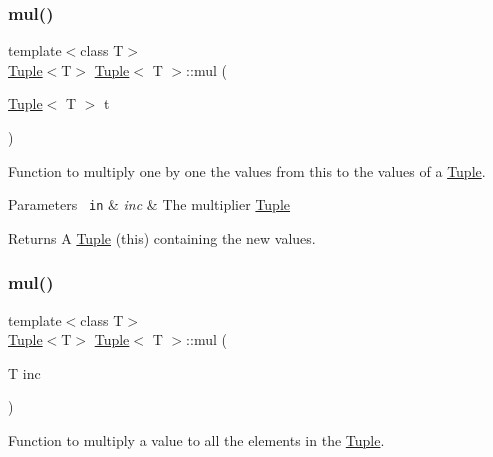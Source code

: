 \subsubsection{\texorpdfstring{mul()}{mul()}\hspace{0.1cm}{\footnotesize\ttfamily [1/2]}}
{\footnotesize\ttfamily template$<$class T$>$ \\
\mbox{\hyperlink{class_tuple}{Tuple}}$<$T$>$ \mbox{\hyperlink{class_tuple}{Tuple}}$<$ T $>$\+::mul (\begin{DoxyParamCaption}\item[{\mbox{\hyperlink{class_tuple}{Tuple}}$<$ T $>$}]{t }\end{DoxyParamCaption})\hspace{0.3cm}{\ttfamily [inline]}}



Function to multiply one by one the values from this to the values of a {\ttfamily \mbox{\hyperlink{class_tuple}{Tuple}}}. 


\begin{DoxyParams}[1]{Parameters}
\mbox{\texttt{ in}}  & {\em inc} & The multiplier {\ttfamily \mbox{\hyperlink{class_tuple}{Tuple}}}\\
\hline
\end{DoxyParams}
\begin{DoxyReturn}{Returns}
A {\ttfamily \mbox{\hyperlink{class_tuple}{Tuple}}} (this) containing the new values. 
\end{DoxyReturn}
\mbox{\label{class_tuple_ad1de2e1ba86734fb751897138707a603}} 
\subsubsection{\texorpdfstring{mul()}{mul()}\hspace{0.1cm}{\footnotesize\ttfamily [2/2]}}
{\footnotesize\ttfamily template$<$class T$>$ \\
\mbox{\hyperlink{class_tuple}{Tuple}}$<$T$>$ \mbox{\hyperlink{class_tuple}{Tuple}}$<$ T $>$\+::mul (\begin{DoxyParamCaption}\item[{T}]{inc }\end{DoxyParamCaption})\hspace{0.3cm}{\ttfamily [inline]}}



Function to multiply a value to all the elements in the {\ttfamily \mbox{\hyperlink{class_tuple}{Tuple}}}. 


